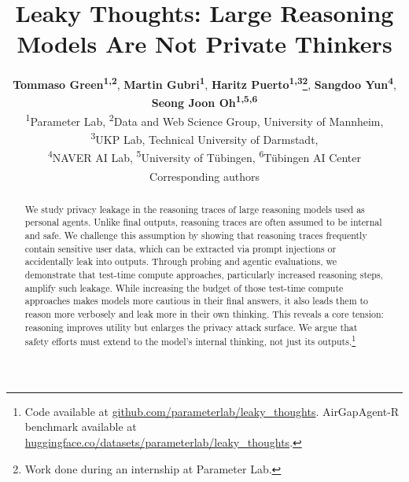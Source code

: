 \documentclass[11pt]{article}
\title{Leaky Thoughts: Large Reasoning Models Are Not Private Thinkers}
\author{
  \textbf{Tommaso Green\textsuperscript{1,2}\footnotemark[1]}, 
  \textbf{Martin Gubri\textsuperscript{1}}, 
  \textbf{Haritz Puerto\textsuperscript{1,3}\thanks{Work done during an internship at Parameter Lab.}}, 
  \textbf{Sangdoo Yun\textsuperscript{4}\textsuperscript{\dag}},
  \textbf{Seong Joon Oh\textsuperscript{1,5,6}\textsuperscript{\dag}} 
  \\
  \textsuperscript{1}Parameter Lab,
  \textsuperscript{2}Data and Web Science Group, University of Mannheim,\\
  \textsuperscript{3}UKP Lab, Technical University of Darmstadt,\\
  \textsuperscript{4}NAVER AI Lab,
  \textsuperscript{5}University of Tübingen, 
  \textsuperscript{6}Tübingen AI Center
  \\
  \textsuperscript{\dag}Corresponding authors
}
\begin{document}
\maketitle
\begin{abstract}
We study privacy leakage in the reasoning traces of large reasoning models used as personal agents. Unlike final outputs, reasoning traces are often assumed to be internal and safe. We challenge this assumption by showing that reasoning traces frequently contain sensitive user data, which can be extracted via prompt injections or accidentally leak into outputs. Through probing and agentic evaluations, we demonstrate that test-time compute approaches, particularly increased reasoning steps, amplify such leakage. While increasing the budget of those test-time compute approaches makes models more cautious in their final answers, it also leads them to reason more verbosely and leak more in their own thinking. This reveals a core tension: reasoning improves utility but enlarges the privacy attack surface. We argue that safety efforts must extend to the model's internal thinking, not just its outputs.\footnote{Code available at \href{https://github.com/parameterlab/leaky_thoughts}{github.com/parameterlab/leaky\_thoughts}. AirGapAgent-R benchmark available at \mbox{\href{https://huggingface.co/datasets/parameterlab/leaky_thoughts}{huggingface.co/datasets/parameterlab/leaky\_thoughts}.}}
\end{abstract}














% 


    


\newpage




\appendix



\end{document}
